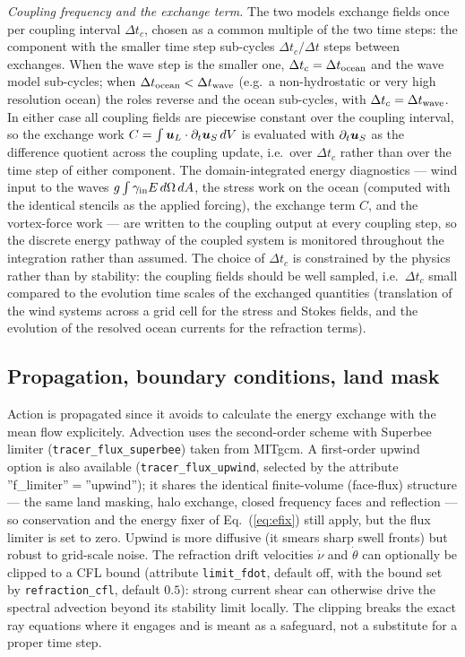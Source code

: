 \documentclass[12pt]{article}
\newcommand{\eq }  [1]{Eq.~(\ref{#1})}  %
\renewcommand{\v}[1]{{\mbox{\boldmath$ #1 $}}}  %
\newcommand{\p}{{\partial}}
\begin{document}
\emph{Coupling frequency and the exchange term.} The two models exchange
fields once per coupling interval $\Delta t_c$, chosen as a common multiple of
the two time steps: the component with the smaller time step sub-cycles
$\Delta t_c/\Delta t$ steps between exchanges. When the wave step is the
smaller one, $\Delta t_c = \Delta t_{\rm ocean}$ and the wave model
sub-cycles; when $\Delta t_{\rm ocean} < \Delta t_{\rm wave}$ (e.g.\ a
non-hydrostatic or very high resolution ocean) the roles reverse and the ocean
sub-cycles, with $\Delta t_c = \Delta t_{\rm wave}$. In either case all
coupling fields are piecewise constant over the coupling interval, so the
exchange work $C=\int \v u_L\cdot\p_t\v u_S\,dV$ is evaluated with
$\p_t\v u_S$ as the difference quotient across the coupling update, i.e.\ over
$\Delta t_c$ rather than over the time step of either component. The
domain-integrated energy diagnostics --- wind input to the waves
$g\int\gamma_{\rm in}E\,d\Omega\,dA$, the stress work on the ocean (computed
with the identical stencils as the applied forcing), the exchange term $C$,
and the vortex-force work --- are written to the coupling output at every
coupling step, so the discrete energy pathway of the coupled system is
monitored throughout the integration rather than assumed. The choice of
$\Delta t_c$ is constrained by the physics rather than by stability: the
coupling fields should be well sampled, i.e.\ $\Delta t_c$ small compared to
the evolution time scales of the exchanged quantities (translation of the wind
systems across a grid cell for the stress and Stokes fields, and the evolution
of the resolved ocean currents for the refraction terms).

  
\subsection*{Propagation, boundary conditions, land mask}

Action is propagated since it avoids to calculate the energy exchange with the mean flow
explicitely. 
Advection uses the second-order scheme with Superbee limiter (\verb|tracer_flux_superbee|)
taken from MITgcm. 
A first-order upwind option is also available (\verb|tracer_flux_upwind|,
selected by the attribute ''f\_limiter''$=$''upwind''); it shares the identical
finite-volume (face-flux) structure --- the same land masking, halo exchange,
closed frequency faces and reflection --- so conservation and the energy fixer
of \eq{eq:efix} still apply, but the flux limiter is set to zero. Upwind is more
diffusive (it smears sharp swell fronts) but robust to grid-scale noise.
The refraction drift velocities $\dot \nu$ and $\dot \theta$ can optionally be
clipped to a CFL bound (attribute \verb|limit_fdot|, default off, with the
bound set by \verb|refraction_cfl|, default $0.5$): strong current shear can
otherwise drive the spectral advection beyond its stability limit locally.
The clipping breaks the exact ray equations where it engages and is meant as
a safeguard, not a substitute for a proper time step.
\end{document}
